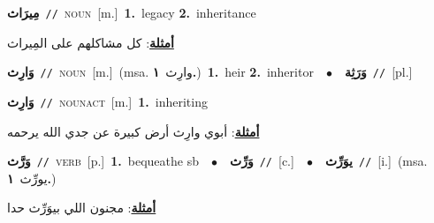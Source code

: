 \documentclass[10pt,a4paper,twoside]{article} %
\begin{document}
\begin{multicols}{2}
{\setlength\topsep{0pt}\textbf{\foreignlanguage{arabic}{مِيرَاث}}\ {\color{gray}\texttt{//}\color{black}}\ \textsc{noun}\ [m.]\ \textbf{1.}~legacy  \textbf{2.}~inheritance\  \begin{flushright}\color{gray}\foreignlanguage{arabic}{\textbf{\underline{\foreignlanguage{arabic}{أمثلة}}}: كل مشاكلهم على المِيراث}\end{flushright}\color{black}} \vspace{2mm}

{\setlength\topsep{0pt}\textbf{\foreignlanguage{arabic}{وَارِث}}\ {\color{gray}\texttt{//}\color{black}}\ \textsc{noun}\ [m.]\ \color{gray}(msa. \foreignlanguage{arabic}{وارِث}~\foreignlanguage{arabic}{\textbf{١.}})\color{black}\ \textbf{1.}~heir  \textbf{2.}~inheritor\ \ $\bullet$\ \ \setlength\topsep{0pt}\textbf{\foreignlanguage{arabic}{وَرَثِة}}\ {\color{gray}\texttt{//}\color{black}}\ [pl.]\ } \vspace{2mm}

{\setlength\topsep{0pt}\textbf{\foreignlanguage{arabic}{وَارِث}}\ {\color{gray}\texttt{//}\color{black}}\ \textsc{noun\textunderscore act}\ [m.]\ \textbf{1.}~inheriting\  \begin{flushright}\color{gray}\foreignlanguage{arabic}{\textbf{\underline{\foreignlanguage{arabic}{أمثلة}}}: أبوي وارِث أرض كبيرة  عن جدي الله يرحمه}\end{flushright}\color{black}} \vspace{2mm}

{\setlength\topsep{0pt}\textbf{\foreignlanguage{arabic}{وَرَّث}}\ {\color{gray}\texttt{//}\color{black}}\ \textsc{verb}\ [p.]\ \textbf{1.}~bequeathe sb\ \ $\bullet$\ \ \setlength\topsep{0pt}\textbf{\foreignlanguage{arabic}{وَرِّث}}\ {\color{gray}\texttt{//}\color{black}}\ [c.]\ \ $\bullet$\ \ \setlength\topsep{0pt}\textbf{\foreignlanguage{arabic}{يوَرِّث}}\ {\color{gray}\texttt{//}\color{black}}\ [i.]\ \color{gray}(msa. \foreignlanguage{arabic}{يورِّث}~\foreignlanguage{arabic}{\textbf{١.}})\color{black}\  \begin{flushright}\color{gray}\foreignlanguage{arabic}{\textbf{\underline{\foreignlanguage{arabic}{أمثلة}}}: مجنون اللي بيوَرِّث حدا}\end{flushright}\color{black}} \vspace{2mm}


\end{multicols}
\end{document}
